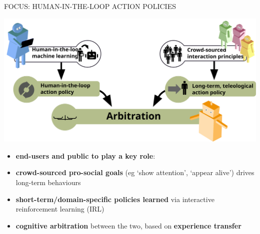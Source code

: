 \documentclass[xcolor=table]{beamer}
\begin{document}
\begin{frame}{FOCUS: HUMAN-IN-THE-LOOP ACTION POLICIES}
    \begin{center}
        \includegraphics[width=0.8\linewidth]{architectures/arbitration}
    \end{center}

    \begin{itemize}
            \scriptsize
        \item \textbf{end-users and public to play a key role}:
        \item \textbf{crowd-sourced pro-social goals} (eg `show attention', `appear
            alive') drives long-term behaviours
        \item \textbf{short-term/domain-specific policies learned} via
            interactive reinforcement learning (IRL)
        \item \textbf{cognitive arbitration} between the two, based on
            \textbf{experience transfer}
    \end{itemize}
\end{frame}
\end{document}
